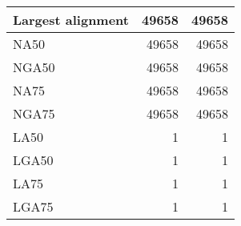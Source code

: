 \documentclass[12pt,a4paper]{article}
\begin{document}
\begin{table}[ht]
\begin{center}
\begin{tabular}{|l*{2}{|r}|}
Largest alignment & 49658 & 49658 \\ \hline
NA50 & 49658 & 49658 \\ \hline
NGA50 & 49658 & 49658 \\ \hline
NA75 & 49658 & 49658 \\ \hline
NGA75 & 49658 & 49658 \\ \hline
LA50 & 1 & 1 \\ \hline
LGA50 & 1 & 1 \\ \hline
LA75 & 1 & 1 \\ \hline
LGA75 & 1 & 1 \\ \hline
\end{tabular}
\end{center}
\end{table}
\end{document}
